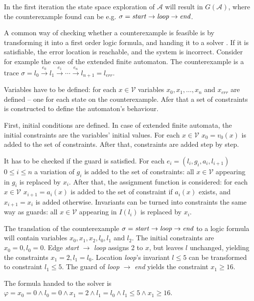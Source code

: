 \begin{example}
 	In the first iteration the state space exploration of $\mathcal{A}$ will result in $G(\mathcal{A})$, where the counterexample found can be e.g. $\sigma = \text{\emph{start}} \to \text{\emph{loop}} \to \text{\emph{end}}$.
 \end{example}
 
 A common way of checking whether a counterexample  is feasible is by transforming it into a first order logic formula, and handing it to a solver \cite{BCCZ99}. If it is satisfiable, the error location is reachable, and the system is incorrect. Consider for example the case of the extended finite automaton. The counterexample is a trace $\sigma = l_0 \xrightarrow{e_0} l_1 \xrightarrow{e_1} \cdots \xrightarrow{e_n} l_{n+1}=l_{err}$.

Variables have to be defined: for each $x \in \mathcal{V}$ variables $x_0,x_1, \dots, x_n$ and $x_{err}$ are defined -- one for each state on the counterexample. Afer that a set of constraints is constructed to define the automaton's behaviour. 

First, initial conditions are defined. In case of extended finite automata, the initial constraints are the variables' initial values. For each $x \in \mathcal{V}$ $x_0=v_0(x)$ is added to the set of constraints. After that, constraints are added step by step. 

It has to be checked if the guard is satisfied. For each $e_i=(l_i,g_i,a_i,l_{i+1})$ $0 \leq i \leq n$ a variation of $g_i$ is added to the set of constraints: all $x \in \mathcal{V}$ appearing in $g_i$ is replaced by $x_i$. After that, the assignment function is considered: for each $x \in \mathcal{V}$ $x_{i+1}=a_i(x)$ is added to the set of constraint if $a_i(x)$ exists, and $x_{i+1}=x_i$ is added otherwise. Invariants can be turned into constraints the same way as guards: all $x \in \mathcal{V}$ appearing in $I(l_i)$ is replaced by $x_i$. 

\begin{example}
	The translation of the counterexample $\sigma = \text{\emph{start}} \to \text{\emph{loop}} \to \text{\emph{end}}$ to a logic formula will contain variables $x_0,x_1,x_2,l_0,l_1$ and $l_2$. The initial constraints are $x_0=0,l_0=0$. Edge \emph{start} $\to$ \emph{loop} assigns 2 to $x$, but leaves $l$ unchanged, yielding the constraints $x_1=2,l_1=l_0$. Location \emph{loop}'s invariant $l \leq 5$ can be transformed to constraint $l_1 \leq 5$. The guard of \emph{loop} $\to$ \emph{end} yields the constraint $x_1 \geq 16$.
	
	The formula handed to the solver is $\varphi = x_0=0 \wedge l_0=0 \wedge x_1=2 \wedge l_1=l_0 \wedge l_1 \leq 5 \wedge x_1 \geq 16$.
\end{example}

